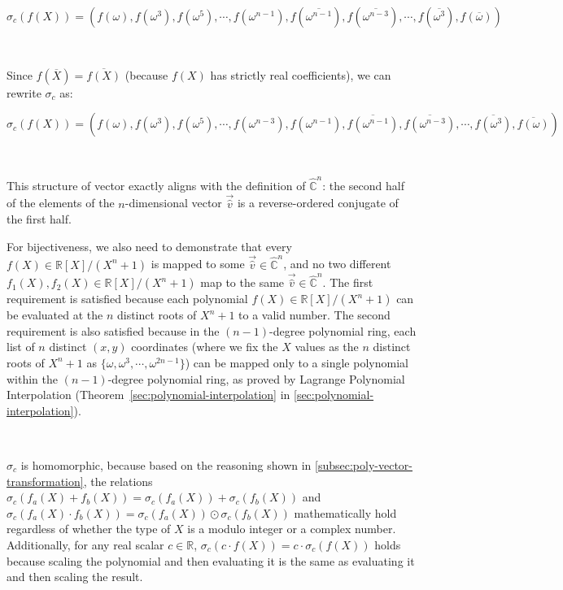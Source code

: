$\sigma_c(f(X)) = (f(\omega),f(\omega^3),f(\omega^5), \cdots, f(\omega^{n-1}), f(\overline{\omega^{n-1}}), f(\overline{\omega^{n-3}}), \cdots, f(\overline{\omega^3}), f(\overline{\omega}))$

$ $

Since $f(\overline{X}) = \overline{f(X)}$ (because $f(X)$ has strictly real coefficients), we can rewrite $\sigma_c$ as: 

$\sigma_c(f(X)) = (f(\omega),f(\omega^3),f(\omega^5), \cdots, f(\omega^{n-3}), f(\omega^{n-1}), \overline{f(\omega^{n-1})}, \overline{f(\omega^{n-3})}, \cdots, \overline{f(\omega^3)}, \overline{f(\omega)})$

$ $

This structure of vector exactly aligns with the definition of $\hat{\mathbb{C}}^n$: the second half of the elements of the $n$-dimensional vector $\vec{\hat v}$ is a reverse-ordered conjugate of the first half.

For bijectiveness, we also need to demonstrate that every $f(X) \in \mathbb{R}[X] / (X^n + 1)$ is mapped to some $\vec{\hat v} \in \hat{\mathbb{C}}^{n}$, and no two different $f_1(X), f_2(X) \in \mathbb{R}[X] / (X^n + 1)$ map to the same $\vec{\hat v} \in \hat{\mathbb{C}}^{n}$. The first requirement is satisfied because each polynomial $f(X) \in \mathbb{R}[X] / (X^n + 1)$ can be evaluated at the $n$ distinct roots of $X^n + 1$ to a valid number. The second requirement is also satisfied because in the $(n-1)$-degree polynomial ring, each list of $n$ distinct $(x, y)$ coordinates (where we fix the $X$ values as the $n$ distinct roots of $X^n + 1$ as $\{\omega, \omega^3, \cdots, \omega^{2n - 1}\}$) can be mapped only to a single polynomial within the $(n-1)$-degree polynomial ring, as proved by Lagrange Polynomial Interpolation (Theorem~\ref*{sec:polynomial-interpolation} in \autoref{sec:polynomial-interpolation}).

$ $

 $\sigma_c$ is homomorphic, because based on the reasoning shown in \autoref{subsec:poly-vector-transformation}, the relations $\sigma_c(f_a(X) + f_b(X)) = \sigma_c(f_a(X)) + \sigma_c(f_b(X))$ and $\sigma_c(f_a(X) \cdot f_b(X)) = \sigma_c(f_a(X)) \odot \sigma_c(f_b(X))$ mathematically hold regardless of whether the type of $X$ is a modulo integer or a complex number. Additionally, for any real scalar $c \in \mathbb{R}$, $\sigma_c(c \cdot f(X)) = c \cdot \sigma_c(f(X))$ holds because scaling the polynomial and then evaluating it is the same as evaluating it and then scaling the result.

